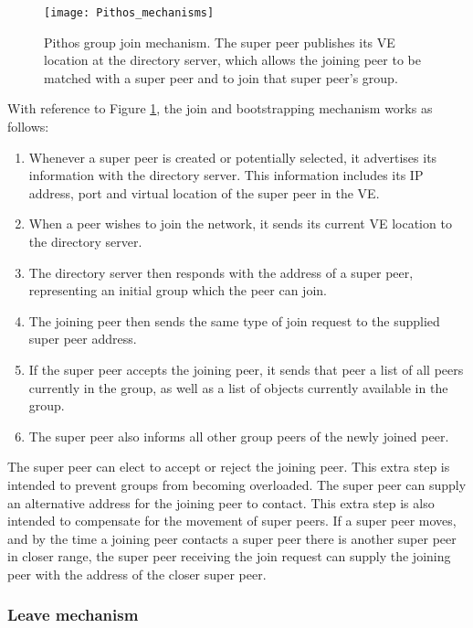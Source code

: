 \begin{figure}[htbp]
 \centering
 \texttt{[image: Pithos\_mechanisms]}
 \caption{Pithos group join mechanism. The super peer publishes its VE location at the directory server, which allows the joining peer to be matched with a super peer and to join that super peer's group.}
 \label{fig_pithos_join}
\end{figure}
%
With reference to Figure \ref{fig_pithos_join}, the join and bootstrapping mechanism works as follows:
%
\begin{enumerate}
\item Whenever a super peer is created or potentially selected, it advertises its information with the directory server. This information includes its IP address, port and virtual location of the super peer in the VE.

\item When a peer wishes to join the network, it sends its current VE location to the directory server.

\item  The directory server then responds with the address of a super peer, representing an initial group which the peer can join.

\item The joining peer then sends the same type of join request to the supplied super peer address.

\item If the super peer accepts the joining peer, it sends that peer a list of all peers currently in the group, as well as a list of objects currently available in the group.

\item The super peer also informs all other group peers of the newly joined peer.
\end{enumerate}

The super peer can elect to accept or reject the joining peer. This extra step is intended to prevent groups from becoming overloaded. The super peer can supply an alternative address for the joining peer to contact. This extra step is also intended to compensate for the movement of super peers. If a super peer moves, and by the time a joining peer contacts a super peer there is another super peer in closer range, the super peer receiving the join request can supply the joining peer with the address of the closer super peer.

\subsubsection{Leave mechanism}
\label{leave_design}

